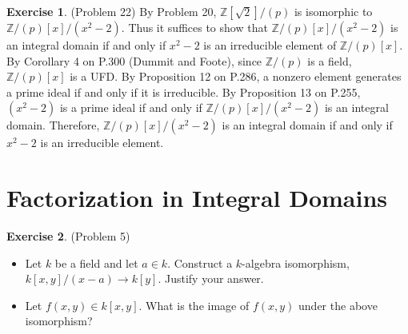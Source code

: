 \documentclass[12pt, psamsfonts]{amsart}
\theoremstyle{definition}
\newtheorem*{exer}{Exercise}
\theoremstyle{remark}
\numberwithin{equation}{section}
\begin{document}
\begin{exer}{(Problem 22)}
  By Problem 20, $\mathbb{Z}[\sqrt{2}]/(p)$ is isomorphic to $\mathbb{Z}/(p)[x]/(x^2 - 2)$.
  Thus it suffices to show that $\mathbb{Z}/(p)[x]/(x^2 - 2)$ is an integral domain if and only if $x^2 - 2$ is an irreducible element of $\mathbb{Z}/(p)[x]$.
  By Corollary 4 on P.300 (Dummit and Foote), since $\mathbb{Z}/(p)$ is a field, $\mathbb{Z}/(p)[x]$ is a UFD.
  By Proposition 12 on P.286, a nonzero element generates a prime ideal if and only if it is irreducible.
  By Proposition 13 on P.255, $(x^2 - 2)$ is a prime ideal if and only if $\mathbb{Z}/(p)[x]/(x^2 - 2)$ is an integral domain.
  Therefore, $\mathbb{Z}/(p)[x]/(x^2 - 2)$ is an integral domain if and only if $x^2 - 2$ is an irreducible element.

\end{exer}

\section{Factorization in Integral Domains}

\begin{exer}{(Problem 5)}
  $ $
  \begin{itemize}
    \item
      Let $k$ be a field and let $a \in k$.
      Construct a $k$-algebra isomorphism, $k[x, y] / (x - a) \rightarrow k[y]$.
      Justify your answer.
    \item
      Let $f(x, y) \in k[x, y]$.
      What is the image of $f(x, y)$ under the above isomorphism?
  \end{itemize}
\end{exer}
\end{document}
